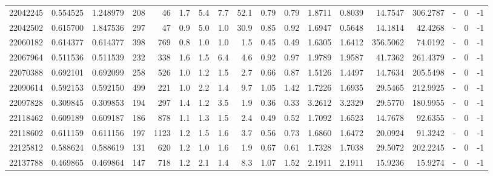 \begin{tabular}{rrrrrrrrrrrrrrrlrr}
  22042245 & 0.554525 &   1.248979 &  208 &   46 &      1.7 &      5.4 &     7.7 &     52.1 &       0.79 &        0.79 &  1.8711 &  0.8039 &   14.7547 &  306.2787 &             - &        0 &         -1 \\
  22042502 & 0.615700 &   1.847536 &  297 &   47 &      0.9 &      5.0 &     1.0 &     30.9 &       0.85 &        0.92 &  1.6947 &  0.5648 &   14.1814 &   42.4268 &             - &        0 &         -1 \\
  22060182 & 0.614377 &   0.614377 &  398 &  769 &      0.8 &      1.0 &     1.0 &      1.5 &       0.45 &        0.49 &  1.6305 &  1.6412 &  356.5062 &   74.0192 &             - &        0 &         -1 \\
  22067964 & 0.511536 &   0.511539 &  232 &  338 &      1.6 &      1.5 &     6.4 &      4.6 &       0.92 &        0.97 &  1.9789 &  1.9587 &   41.7362 &  261.4379 &             - &        0 &         -1 \\
  22070388 & 0.692101 &   0.692099 &  258 &  526 &      1.0 &      1.2 &     1.5 &      2.7 &       0.66 &        0.87 &  1.5126 &  1.4497 &   14.7634 &  205.5498 &             - &        0 &         -1 \\
  22090614 & 0.592153 &   0.592150 &  499 &  221 &      1.0 &      2.2 &     1.4 &      9.7 &       1.05 &        1.42 &  1.7226 &  1.6935 &   29.5465 &  212.9925 &             - &        0 &         -1 \\
  22097828 & 0.309845 &   0.309853 &  194 &  297 &      1.4 &      1.2 &     3.5 &      1.9 &       0.36 &        0.33 &  3.2612 &  3.2329 &   29.5770 &  180.9955 &             - &        0 &         -1 \\
  22118462 & 0.609189 &   0.609187 &  186 &  878 &      1.1 &      1.3 &     1.5 &      2.4 &       0.49 &        0.52 &  1.7092 &  1.6523 &   14.7678 &   92.6355 &             - &        0 &         -1 \\
  22118602 & 0.611159 &   0.611156 &  197 & 1123 &      1.2 &      1.5 &     1.6 &      3.7 &       0.56 &        0.73 &  1.6860 &  1.6472 &   20.0924 &   91.3242 &             - &        0 &         -1 \\
  22125812 & 0.588624 &   0.588619 &  131 &  620 &      1.2 &      1.0 &     1.6 &      1.9 &       0.67 &        0.61 &  1.7328 &  1.7038 &   29.5072 &  202.2245 &             - &        0 &         -1 \\
  22137788 & 0.469865 &   0.469864 &  147 &  718 &      1.2 &      2.1 &     1.4 &      8.3 &       1.07 &        1.52 &  2.1911 &  2.1911 &   15.9236 &   15.9274 &             - &        0 &         -1 \\

\end{tabular}
